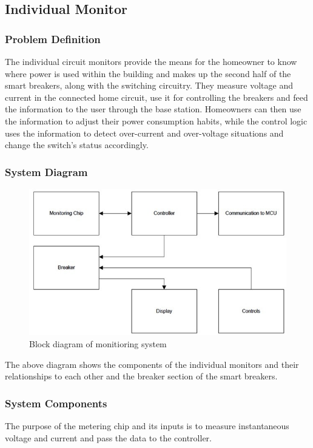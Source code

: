 \subsection{Individual Monitor}
\subsubsection{Problem Definition}
The individual circuit monitors provide the means for the homeowner to know where power is used within the building and makes up the second half of the smart breakers, along with the switching circuitry. They measure voltage and current in the connected home circuit, use it for controlling the breakers and feed the information to the user through the base station. Homeowners can then use the information to adjust their power consumption habits, while the control logic uses the information to detect over-current and over-voltage situations and change the switch's status accordingly. 

\subsubsection{System Diagram}
\begin{figure}[htbp]
\begin{center}
\includegraphics[width=5in]{includes/NJMonitorSystemDiagram}
\caption{Block diagram of monitioring system}
\label{fig:monitor_system_diagram}
\end{center}
\end{figure}

The above diagram shows the components of the individual monitors and their relationships to each other and the breaker section of the smart breakers. 

\subsubsection{System Components}
The purpose of the metering chip and its inputs is to measure instantaneous voltage and current and pass the data to the controller. 

